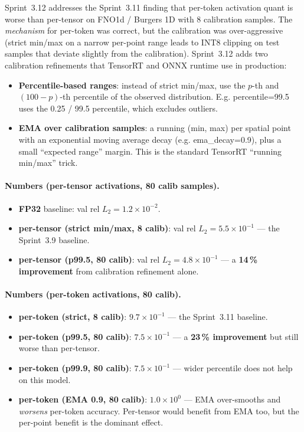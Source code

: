 \documentclass[10pt,twocolumn]{article}
\renewcommand{\texttt}[1]{{\normalfont\ttfamily #1}\normalfont\rmfamily}
\begin{document}
Sprint~3.12 addresses the Sprint~3.11 finding that
per-token activation quant is worse than per-tensor
on FNO1d / Burgers 1D with 8 calibration samples.  The
\emph{mechanism} for per-token was correct, but the
calibration was over-aggressive (strict min/max on a
narrow per-point range leads to INT8 clipping on test
samples that deviate slightly from the calibration).
Sprint~3.12 adds two calibration refinements that
TensorRT and ONNX runtime use in production:
\begin{itemize}
\item \textbf{Percentile-based ranges}: instead of
strict min/max, use the $p$-th and $(100 - p)$-th
percentile of the observed distribution.  E.g.
\texttt{percentile=99.5} uses the 0.25 / 99.5
percentile, which excludes outliers.
\item \textbf{EMA over calibration samples}: a
running (min, max) per spatial point with an
exponential moving average decay
(e.g. \texttt{ema\_decay=0.9}), plus a small
``expected range'' margin.  This is the standard
TensorRT ``running min/max'' trick.
\end{itemize}

\paragraph{Numbers (per-tensor activations, 80 calib samples).}
\begin{itemize}
\item \textbf{FP32} baseline: val rel $L_2 = 1.2
\times 10^{-2}$.
\item \textbf{per-tensor (strict min/max, 8 calib)}:
val rel $L_2 = 5.5 \times 10^{-1}$ --- the
Sprint~3.9 baseline.
\item \textbf{per-tensor (p99.5, 80 calib)}: val
rel $L_2 = 4.8 \times 10^{-1}$ --- a \textbf{14\,\%
improvement} from calibration refinement alone.
\end{itemize}

\paragraph{Numbers (per-token activations, 80 calib).}
\begin{itemize}
\item \textbf{per-token (strict, 8 calib)}: $9.7 \times
10^{-1}$ --- the Sprint~3.11 baseline.
\item \textbf{per-token (p99.5, 80 calib)}: $7.5
\times 10^{-1}$ --- a \textbf{23\,\% improvement} but
still worse than per-tensor.
\item \textbf{per-token (p99.9, 80 calib)}: $7.5
\times 10^{-1}$ --- wider percentile does not help
on this model.
\item \textbf{per-token (EMA 0.9, 80 calib)}: $1.0
\times 10^{0}$ --- EMA over-smooths and \emph{worsens}
per-token accuracy.  Per-tensor would benefit from
EMA too, but the per-point benefit is the dominant
effect.
\end{itemize}
\end{document}
